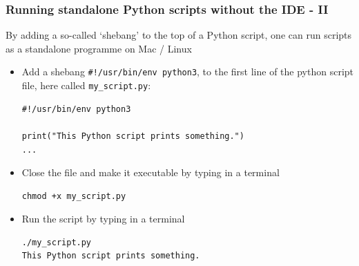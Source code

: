 \documentclass[xcolor=table,aspectratio=169]{beamer}
\begin{document}
\begin{frame}[fragile]
\frametitle{Running standalone Python scripts without the IDE - II}
By adding a so-called `shebang' to the top of a Python script, one 
can run scripts as a standalone programme on Mac / Linux \vspace{3pt}
   \pause 
\begin{itemize}\addtolength{\itemsep}{0.05\baselineskip}
    \item Add a shebang \texttt{\#!/usr/bin/env python3}, to the first line of the python script file, here called \texttt{my\_script.py}:
\begin{lstlisting}[style=python]
#!/usr/bin/env python3

print("This Python script prints something.")
...
\end{lstlisting}
    \pause 
    \item Close the file and make it executable by typing in a terminal
\begin{lstlisting}[style=bash]
chmod +x my_script.py
\end{lstlisting}
    \pause 
    \item Run the script by typing in a terminal
\begin{lstlisting}[style=bash]
./my_script.py
This Python script prints something.
\end{lstlisting}
\end{itemize}
\end{frame}
\end{document}
